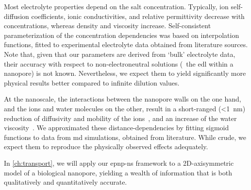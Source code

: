 Most electrolyte properties depend on the salt concentration. Typically, ion self-diffusion coefficients,
ionic conductivities, and relative permittivity decrease with concentrations, whereas density and  viscosity
increase. Self-consistent parameterization of the concentration dependencies was based on interpolation
functions, fitted to experimental electrolyte data obtained from literature sources. Note that, given that our
parameters are derived from `bulk' electrolyte data, their accuracy with respect to non-electroneutral
solutions (\eg~the \gls{edl} within a nanopore) is not known. Nevertheless, we expect them to yield
significantly more physical results better compared to infinite dilution values. 

At the nanoscale, the interactions between the nanopore walls on the one hand, and the ions and water
molecules on the other, result in a short-ranged (\SI{<1}{\nm}) reduction of diffusivity and mobility of the
ions~\cite{Makarov-1998}, and an increase of the water viscosity~\cite{Pronk-2014}. We approximated these
distance-dependencies by fitting sigmoid functions to data from \gls{md} simulations, obtained from
literature. While crude, we expect them to reproduce the physically observed effects adequately.

In \cref{ch:transport}, we will apply our \gls{epnp-ns} framework to a 2D-axisymmetric model of a biological
nanopore, yielding a wealth of information that is both qualitatively and quantitatively accurate. 


\cleardoublepage


